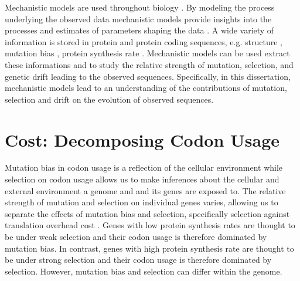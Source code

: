 Mechanistic models are used throughout biology \citep{GoldmanAndYang1994,loreau1998,DavisAndPelsor2001,adf2007,McGill2007}.
By modeling the process underlying the observed data mechanistic models provide insights into the processes and estimates of parameters shaping the data \citep{Liberles2013}.
A wide variety of information is stored in protein and protein coding sequences, e.g. structure \citep{anfinsen1973}, mutation bias \citep{ShahAndGilchrist2011, gilchrist2015}, protein synthesis rate \citep{gilchrist2007,gilchrist2015}. 
Mechanistic models can be used extract these informations and to study the relative strength of mutation, selection, and genetic drift leading to the observed sequences.
Specifically, in this dissertation, mechanistic models lead to an understanding of the contributions of mutation, selection and drift on the evolution of observed sequences.

\section{Cost: Decomposing Codon Usage}

Mutation bias in codon usage is a reflection of the cellular environment while selection on codon usage allows us to make inferences about the cellular and external environment a genome and and its genes are exposed to.
The relative strength of mutation and selection on individual genes varies, allowing us to separate the effects of mutation bias and selection, specifically selection against translation overhead cost \citep{gilchrist2007,ShahAndGilchrist2011,gilchrist2015}.
Genes with low protein synthesis rates are thought to be under weak selection and their codon usage is therefore dominated by mutation bias.
In contrast, genes with high protein synthesis rate are thought to be under strong selection and their codon usage is therefore dominated by selection.
However, mutation bias and selection can differ within the genome.

